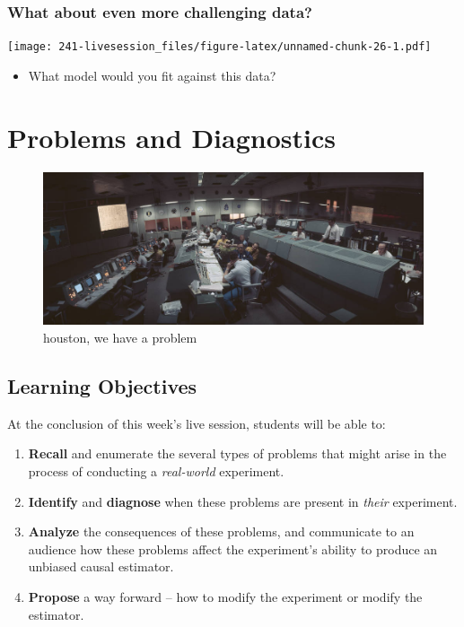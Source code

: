 \documentclass[
]{book}
\providecommand{\tightlist}{%
  \setlength{\itemsep}{0pt}\setlength{\parskip}{0pt}}
\begin{document}
\hypertarget{what-about-even-more-challenging-data}{%
\subsection{What about even more challenging
data?}\label{what-about-even-more-challenging-data}}

\texttt{[image: 241-livesession\_files/figure-latex/unnamed-chunk-26-1.pdf]}

\begin{itemize}
\tightlist
\item
  What model would you fit against this data?
\end{itemize}

\hypertarget{problems-and-diagnostics}{%
\chapter{Problems and Diagnostics}\label{problems-and-diagnostics}}

\begin{figure}
\centering
\includegraphics{./images/apollo_13.jpeg}
\caption{houston, we have a problem}
\end{figure}

\hypertarget{learning-objectives-10}{%
\section{Learning Objectives}\label{learning-objectives-10}}

At the conclusion of this week's live session, students will be able to:

\begin{enumerate}
\def\labelenumi{\arabic{enumi}.}
\tightlist
\item
  \textbf{Recall} and enumerate the several types of problems that might
  arise in the process of conducting a \emph{real-world} experiment.
\item
  \textbf{Identify} and \textbf{diagnose} when these problems are
  present in \emph{their} experiment.
\item
  \textbf{Analyze} the consequences of these problems, and communicate
  to an audience how these problems affect the experiment's ability to
  produce an unbiased causal estimator.
\item
  \textbf{Propose} a way forward -- how to modify the experiment or
  modify the estimator.
\end{enumerate}
\end{document}
